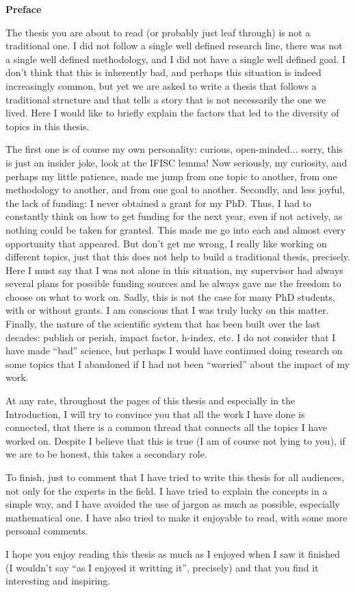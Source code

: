 \pagebreak
\thispagestyle{empty}

\begin{center}
    \textbf{\Large Preface}
\end{center}

The thesis you are about to read (or probably just leaf through) is not a
traditional one. I did not follow a single well defined research line, there
was not a single well defined methodology, and I did not have a single well
defined goal. I don't think that this is inherently bad, and perhaps this
situation is indeed increasingly common, but yet we are asked to write a thesis
that follows a traditional structure and that tells a story that is not
necessarily the one we lived. Here I would like to briefly explain the factors
that led to the diversity of topics in this thesis.

The first one is of course my own personality: curious, open-minded... sorry,
this is just an insider joke, look at the IFISC lemma! Now seriously, my
curiosity, and perhaps my little patience, made me jump from one topic to
another, from one methodology to another, and from one goal to another.
Secondly, and less joyful, the lack of funding: I never obtained a grant for my
PhD. Thus, I had to constantly think on how to get funding for
the next year, even if not actively, as nothing could be taken for granted.
This made me go into each and almost every opportunity that appeared. But don't
get me wrong, I really like working on different topics, just that this does
not help to build a traditional thesis, precisely. Here I must say that I was
not alone in this situation, my supervisor had always several plans for
possible funding sources and he always gave me the freedom to choose on what to
work on. Sadly, this is not the case for many PhD students, with or without
grants. I am conscious that I was truly lucky on this matter. Finally, the
nature of the scientific system that has been built over the last decades:
publish or perish, impact factor, h-index, etc. I do not consider that I
have made ``bad'' science, but perhaps I would have continued doing research on
some topics that I abandoned if I had not been ``worried'' about the impact of
my work.

At any rate, throughout the pages of this thesis and especially in the
Introduction, I will try to convince you that all the work I have done is
connected, that there is a common thread that connects all the topics I have
worked on. Despite I believe that this is true (I am of course not lying to
you), if we are to be honest, this takes a secondary role.

To finish, just to comment that I have tried to write this thesis for all
audiences, not only for the experts in the field. I have tried to explain the
concepts in a simple way, and I have avoided the use of jargon as much as
possible, especially mathematical one. I have also tried to make it enjoyable
to read, with some more personal comments.

I hope you enjoy reading this thesis as much as I enjoyed when I saw it
finished (I wouldn't say ``as I enjoyed it writting it'', precisely) and that
you find it interesting and inspiring.

\vfill